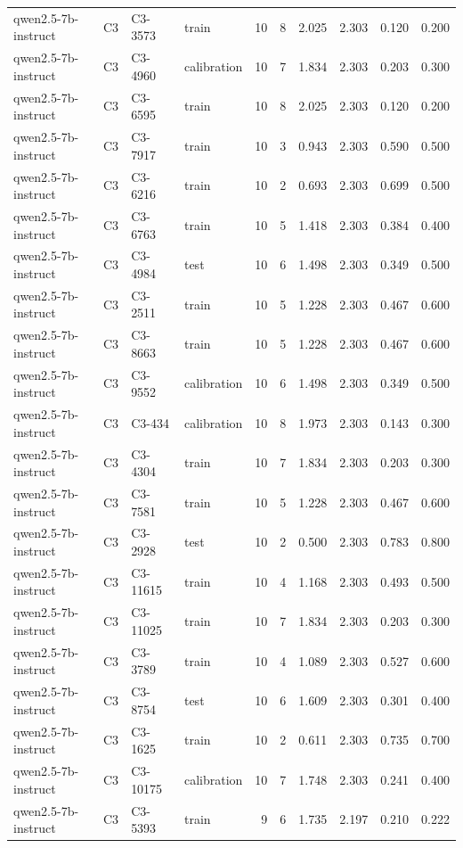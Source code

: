 \begin{table}
\begin{tabular}{llllrrrrrr}
qwen2.5-7b-instruct & C3 & C3-3573 & train & 10 & 8 & 2.025 & 2.303 & 0.120 & 0.200 \\
qwen2.5-7b-instruct & C3 & C3-4960 & calibration & 10 & 7 & 1.834 & 2.303 & 0.203 & 0.300 \\
qwen2.5-7b-instruct & C3 & C3-6595 & train & 10 & 8 & 2.025 & 2.303 & 0.120 & 0.200 \\
qwen2.5-7b-instruct & C3 & C3-7917 & train & 10 & 3 & 0.943 & 2.303 & 0.590 & 0.500 \\
qwen2.5-7b-instruct & C3 & C3-6216 & train & 10 & 2 & 0.693 & 2.303 & 0.699 & 0.500 \\
qwen2.5-7b-instruct & C3 & C3-6763 & train & 10 & 5 & 1.418 & 2.303 & 0.384 & 0.400 \\
qwen2.5-7b-instruct & C3 & C3-4984 & test & 10 & 6 & 1.498 & 2.303 & 0.349 & 0.500 \\
qwen2.5-7b-instruct & C3 & C3-2511 & train & 10 & 5 & 1.228 & 2.303 & 0.467 & 0.600 \\
qwen2.5-7b-instruct & C3 & C3-8663 & train & 10 & 5 & 1.228 & 2.303 & 0.467 & 0.600 \\
qwen2.5-7b-instruct & C3 & C3-9552 & calibration & 10 & 6 & 1.498 & 2.303 & 0.349 & 0.500 \\
qwen2.5-7b-instruct & C3 & C3-434 & calibration & 10 & 8 & 1.973 & 2.303 & 0.143 & 0.300 \\
qwen2.5-7b-instruct & C3 & C3-4304 & train & 10 & 7 & 1.834 & 2.303 & 0.203 & 0.300 \\
qwen2.5-7b-instruct & C3 & C3-7581 & train & 10 & 5 & 1.228 & 2.303 & 0.467 & 0.600 \\
qwen2.5-7b-instruct & C3 & C3-2928 & test & 10 & 2 & 0.500 & 2.303 & 0.783 & 0.800 \\
qwen2.5-7b-instruct & C3 & C3-11615 & train & 10 & 4 & 1.168 & 2.303 & 0.493 & 0.500 \\
qwen2.5-7b-instruct & C3 & C3-11025 & train & 10 & 7 & 1.834 & 2.303 & 0.203 & 0.300 \\
qwen2.5-7b-instruct & C3 & C3-3789 & train & 10 & 4 & 1.089 & 2.303 & 0.527 & 0.600 \\
qwen2.5-7b-instruct & C3 & C3-8754 & test & 10 & 6 & 1.609 & 2.303 & 0.301 & 0.400 \\
qwen2.5-7b-instruct & C3 & C3-1625 & train & 10 & 2 & 0.611 & 2.303 & 0.735 & 0.700 \\
qwen2.5-7b-instruct & C3 & C3-10175 & calibration & 10 & 7 & 1.748 & 2.303 & 0.241 & 0.400 \\
qwen2.5-7b-instruct & C3 & C3-5393 & train & 9 & 6 & 1.735 & 2.197 & 0.210 & 0.222 \\

\end{tabular}
\end{table}
